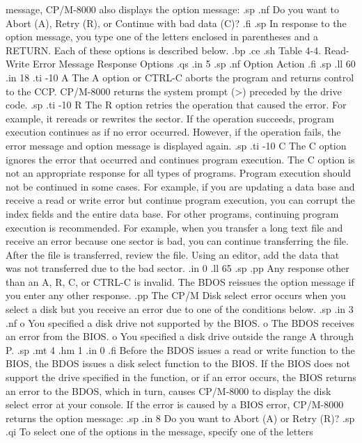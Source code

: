 message, CP/M-8000 also displays the option message:
.sp
.nf
Do you want to Abort (A), Retry (R), or Continue with bad data (C)?
.fi
.sp
In response to the option message, you type one of the 
letters enclosed in parentheses and a RETURN.  Each of these 
options is described below.
.bp
.ce
.sh
Table 4-4.  Read-Write Error Message Response Options
.qs
.in 5
.sp
.nf
Option                         Action 
.fi
.sp
.ll 60
.in 18
.ti -10
A         The A option or CTRL-C aborts the program and returns control to
the CCP. CP/M-8000 returns the system prompt (>) preceded by the drive code.
.sp
.ti -10
R         The R option retries the operation that caused the error.  For
example, it rereads or rewrites the sector. 
If the operation succeeds, program execution continues
as if no error occurred.  However, if the operation fails, the error
message and option message is displayed again. 
.sp
.ti -10
C         The C option ignores the error that occurred and continues
program execution.  The C option is not an appropriate response for all
types of programs. Program execution should not be continued in some cases.
For example, if you are updating a data base and receive a read or write
error but continue program execution, you can corrupt the index fields and
the entire data base. For other programs, continuing program execution is
recommended. For example, when you transfer a long text file and receive an
error because one sector is bad, you can continue transferring the file.
After the file is transferred, review the file. Using an editor, add the
data that was not transferred due to the bad sector. 
.in 0
.ll 65
.sp
.pp
Any response other than an A, R, C, or CTRL-C is invalid. The BDOS
reissues the option message if you enter any other response. 
.pp
The CP/M Disk select error occurs when you select a disk but
you receive an error due to one of the conditions below.
.sp
.in 3
.nf
o  You specified a disk drive not supported by the BIOS.
o  The BDOS receives an error from the BIOS.
o  You specified a disk drive outside the range A through P.
.sp
.mt 4
.hm 1
.in 0
.fi
Before the BDOS issues a read or write function to
the BIOS, the BDOS issues a disk select function to the BIOS.  If the BIOS
does not support the drive specified in the function, or if an error occurs,
the BIOS returns an error to the BDOS, which in turn, causes CP/M-8000 to
display the disk select error at your console.  If the error is caused by 
a BIOS error, CP/M-8000 returns the option message:
.sp
.in 8
Do you want to Abort (A) or Retry (R)?
.sp
.qi
To select one of the options in the message, specify one of the letters
